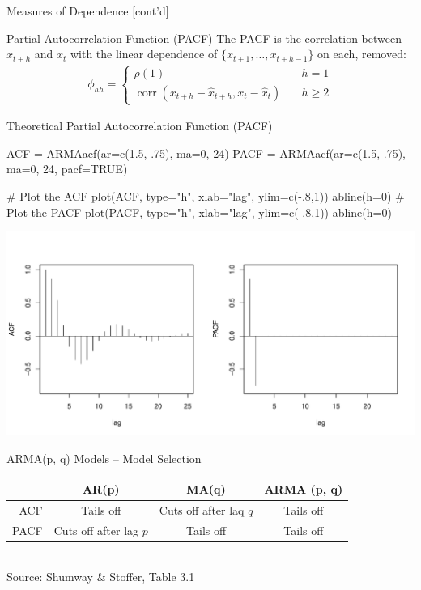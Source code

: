 \documentclass[ignorenonframetext,xcolor=x11names]{beamer}
\begin{document}
\begin{frame}[fragile]{Measures of Dependence \small [cont'd]}
\begin{block}{Partial Autocorrelation Function (PACF)}
The PACF is the correlation between $x_{t+h}$ and $x_t$ with the linear dependence of $\{x_{t+1}, \ldots, x_{t+h-1}\}$ on each, removed:
\begin{align*}
\phi_{hh} = \begin{cases}\rho(1) &\quad h = 1 \\
 \operatorname{corr}(x_{t+h} - \hat{x}_{t+h}, x_t - \hat{x}_t) &\quad h \geq 2
 \end{cases}
\end{align*}
\end{block}
\end{frame}


\begin{frame}[fragile]{Theoretical Partial Autocorrelation Function (PACF)}
\begin{Rcode}
ACF  = ARMAacf(ar=c(1.5,-.75), ma=0, 24)
PACF = ARMAacf(ar=c(1.5,-.75), ma=0, 24, pacf=TRUE)

# Plot the ACF
plot(ACF, type="h", xlab="lag", ylim=c(-.8,1))
abline(h=0)
# Plot the PACF
plot(PACF, type="h", xlab="lag", ylim=c(-.8,1))
abline(h=0)
\end{Rcode}
\vspace{-2\baselineskip}
\begin{center}
\includegraphics[width=\textwidth]{figure20.pdf}
\end{center}
\end{frame}

\begin{frame}{ARMA(p, q) Models -- Model Selection}
\small
\renewcommand{\arraystretch}{1.5}
\begin{tabular}{r|c|c|c} \hline
 & AR(p) & MA(q) & ARMA (p, q) \\ \hline
 ACF & Tails off & Cuts off after laq $q$ & Tails off \\
 PACF & Cuts off after lag $p$ & Tails off & Tails off \\ \hline
\end{tabular} \\

\vspace{\baselineskip}
\scriptsize Source: Shumway \& Stoffer, Table 3.1 \normalsize
\end{frame}
\end{document}
